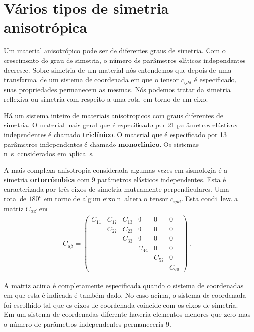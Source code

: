 \section{V\'arios tipos de simetria anisotr\'opica}

Um material anisotr\'opico pode ser de diferentes graus de
simetria. Com o crescimento do grau de simetria, o n\'umero
de par\^ametros el\'aticos independentes decresce. Sobre
simetria de um material n\'os entendemos que depois de uma
transforma\cao\ de um sistema de coordenada em que o tensor
$c_{ijkl}$ \'e especificado, suas propriedades permanecem
as mesmas. N\'os podemos tratar da simetria reflexiva ou
simetria com respeito a uma rota\cao\ em torno de um eixo.

H\'a um sistema inteiro de materiais anisotropicos com
graus diferentes de simetria. O material mais geral que
\'e especificado por 21 par\^ametros el\'asticos
independentes \'e chamado {\bf tricl\'inico}. O material que
\'e especificado por 13 par\^ametros independentes \'e
chamado {\bf monocl\'inico}. Os sistemas n\ao\ s\ao\
considerados em aplica\coes\ s\ismicas.

A mais complexa anisotropia considerada algumas vezes em 
sismologia \'e a simetria {\bf ortorr\^ombica} com 9
par\^ametros el\'asticos independentes. Esta \'e
caracterizada por tr\^es eixos de simetria mutuamente
perpendiculares. Uma rota\cao\ de $180^{o}$ em
torno de algum eixo n\ao\ altera o tensor $c_{ijkl}$.
Esta condi\cao\ leva a matriz $C_{\alpha \beta}$ em
\begin{eqnarray}
C_{\alpha \beta} = \left(
\begin{array}{cccccc}
C_{11} & C_{12} & C_{13} & 0      & 0      & 0 \\
       & C_{22} & C_{23} & 0      & 0      & 0 \\
       &        & C_{33} & 0      & 0      & 0 \\
       &        &        & C_{44} & 0      & 0 \\
       &        &        &        & C_{55} & 0 \\
       &        &        &        &        & C_{66}
\end{array} \right) \; .
\end{eqnarray}

A matriz acima \'e completamente especificada quando o
sistema de coordenadas em que esta \'e indicada \'e
tamb\'em dado. No caso acima, o sistema de coordenada foi
escolhido tal que os eixos de coordenada coincide com os
eixos de simetria. Em um sistema de coordenadas diferente
haveria elementos menores que zero mas o n\'umero de
par\^ametros independentes permaneceria 9.

